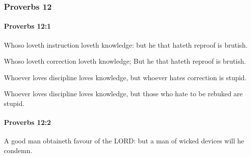 	\subsubsection{Proverbs 12} %
		\label{PROVERBS-12}

		\paragraph{Proverbs 12:1} %
			\label{PROVERBS-12-1}

			Whoso loveth instruction loveth knowledge: but he that hateth reproof is brutish.

			\begin{versebox}
					\item[BHS] 
					\item[ASV] Whoso loveth correction loveth knowledge; But he that hateth reproof is brutish.
					\item[NIV] Whoever loves discipline loves knowledge, but whoever hates correction is stupid.
					\item[NRSV] Whoever loves discipline loves knowledge, but those who hate to be rebuked are stupid.
			\end{versebox}

		\paragraph{Proverbs 12:2} %
			\label{PROVERBS-12-2}

			A good man obtaineth favour of the LORD: but a man of wicked devices will he condemn.

